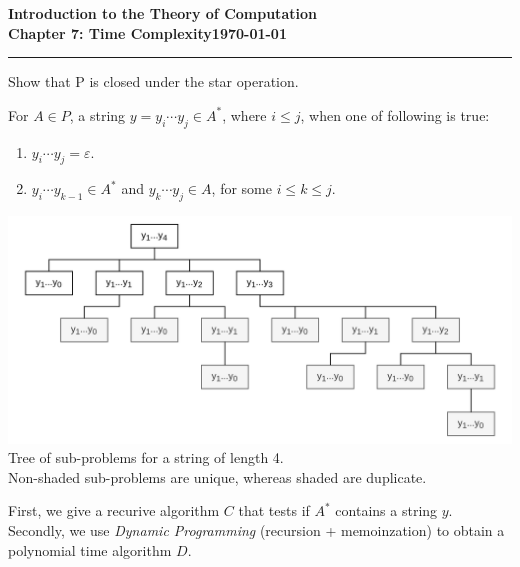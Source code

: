 \documentclass[11pt]{article}
\newcommand{\dated}{\today}
\begin{document}
\textbf{Introduction to the Theory of
Computation}\hfill\textbf{\myname}\\[0.01in]
\textbf{Chapter 7: Time Complexity}\hfill\textbf{\dated}\\
\smallskip\hrule\bigskip

\begin{problem}{7.15}
Show that P is closed under the star operation.
\end{problem}
\begin{idea}
For $A \in P$, a string $y = y_i \cdots y_j \in A^{*}$, where $i \leq j$, when one of following is true:
\begin{enumerate}
\item $y_i \cdots y_j = \varepsilon$.
\item $y_i \cdots y_{k-1} \in A^{*}$ and $y_k \cdots y_j \in A$, for some $i \leq k \leq j$.
\end{enumerate}
\begin{center}
\includegraphics[scale=0.7]{Figures/Problem7.15.pdf} \\
Tree of sub-problems for a string of length 4. \\
Non-shaded sub-problems are unique, whereas shaded are duplicate.
\end{center}
First, we give a recurive algorithm $C$ that tests if $A^{*}$ contains a string $y$. Secondly, we use \textit{Dynamic Programming} (recursion + memoinzation) to obtain a polynomial time algorithm $D$.
\end{idea}
\end{document}
